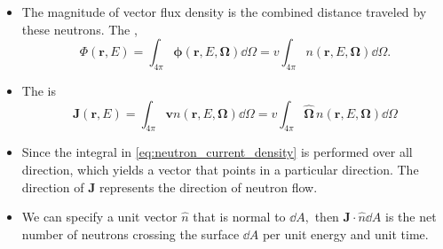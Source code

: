 \documentclass[a4paper]{article}
\begin{document}
\begin{itemize}
    \item The magnitude of vector flux density is the combined distance traveled by these neutrons. The ,\begin{equation}
        \Phi(\mathbf r,E)=\int_{4\pi}\mathbf\phi(\mathbf r, E,\mathbf\Omega)\dd\Omega=v\int_{4\pi}n(\mathbf r, E,\mathbf\Omega)\dd\Omega.
    \end{equation}
    \item The  is\begin{equation}
        \mathbf J(\mathbf r,E)=\int_{4\pi}\mathbf vn(\mathbf r,E,\mathbf\Omega)\dd\Omega=v\int_{4\pi}\hat{\mathbf\Omega}\, n(\mathbf r,E,\mathbf\Omega)\dd\Omega\label{eq:neutron_current_density}
    \end{equation}
    \item Since the integral in \eqref{eq:neutron_current_density} is performed over all direction, which yields a vector that points in a particular direction. The direction of $\mathbf J$ represents the direction of  neutron flow.
    \item We can specify a unit vector $\hat n$ that is normal to $\dd A,$ then $\mathbf J\cdot\hat n\dd A$ is the net number of neutrons crossing the surface $\dd A$ per unit energy and unit time.
\end{itemize}
\end{document}
